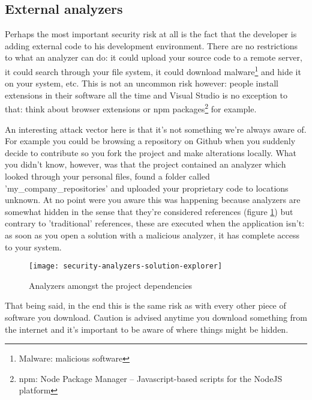 \subsection{External analyzers}
\label{sec:security-external-analyzers}

Perhaps the most important security risk at all is the fact that the developer is adding external code to his development environment. There are no restrictions to what an analyzer can do: it could upload your source code to a remote server, it could search through your file system, it could download malware\footnote{Malware: malicious software} and hide it on your system, etc. This is not an uncommon risk however: people install extensions in their software all the time and Visual Studio is no exception to that: think about browser extensions or npm packages\footnote{npm: Node Package Manager -- Javascript-based scripts for the NodeJS platform} for example. 

An interesting attack vector here is that it's not something we're always aware of. For example you could be browsing a repository on Github when you suddenly decide to contribute so you fork the project and make alterations locally. What you didn't know, however, was that the project contained an analyzer which looked through your personal files, found a folder called 'my\_company\_repositories' and uploaded your proprietary code to locations unknown. At no point were you aware this was happening because analyzers are somewhat hidden in the sense that they're considered references (figure \ref{img:security-analyzers-solution-explorer}) but contrary to 'traditional' references, these are executed when the application isn't: as soon as you open a solution with a malicious analyzer, it has complete access to your system.

\begin{figure}[H]
\centering
\texttt{[image: security-analyzers-solution-explorer]}
\caption[Analyzers amongst the project dependencies]{Analyzers amongst the project dependencies}
\label{img:security-analyzers-solution-explorer}
\end{figure}

That being said, in the end this is the same risk as with every other piece of software you download. Caution is advised anytime you download something from the internet and it's important to be aware of where things might be hidden.